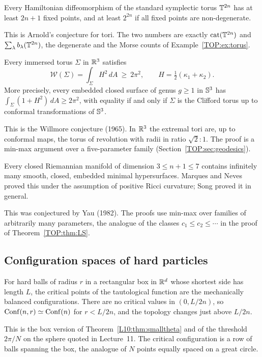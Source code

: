 \begin{theorem}
Every Hamiltonian diffeomorphism of the standard symplectic torus $\mathbb{T}^{2n}$ has at least $2n+1$ fixed points,
and at least $2^{2n}$ if all fixed points are non-degenerate.
\end{theorem}
\noindent This is Arnold's conjecture for tori. The two numbers are exactly
$\operatorname{cat}(\mathbb{T}^{2n})$ and $\sum_\lambda b_\lambda(\mathbb{T}^{2n})$, the degenerate and the Morse counts of
Example~\ref{TOP:ex:torus}.

\begin{theorem}\label{TOP:thm:willmore}
Every immersed torus $\Sigma$ in $\mathbb{R}^3$ satisfies
\[
  \mathcal W(\Sigma)=\int_\Sigma H^2\,dA\ \ge\ 2\pi^2,\qquad H=\tfrac12(\kappa_1+\kappa_2).
\]
More precisely, every embedded closed surface of genus $g\ge1$ in $\mathbb{S}^3$ has
$\int_\Sigma(1+H^2)\,dA\ge2\pi^2$, with equality if and only if $\Sigma$ is the Clifford torus up to
conformal transformations of $\mathbb{S}^3$.
\end{theorem}
\noindent This is the Willmore conjecture (1965). In $\mathbb{R}^3$ the extremal tori are, up to conformal
maps, the torus of revolution with radii in ratio $\sqrt2:1$. The proof is a min-max argument over a
five-parameter family (Section~\ref{TOP:sec:geodesics}).

\begin{theorem}\label{TOP:thm:yau}
Every closed Riemannian manifold of dimension $3\le n+1\le7$ contains infinitely many smooth, closed,
embedded minimal hypersurfaces. Marques and Neves proved this under the assumption of positive Ricci curvature;
Song proved it in general.
\end{theorem}
\noindent This was conjectured by Yau (1982). The proofs use min-max over families of arbitrarily many
parameters, the analogue of the classes $c_1\le c_2\le\cdots$ in the proof of Theorem~\ref{TOP:thm:LS}.

\subsection*{Configuration spaces of hard particles}

\begin{theorem}\label{TOP:thm:BBK}
For hard balls of radius $r$ in a rectangular box in $\mathbb{R}^d$ whose shortest side has length $L$, the
critical points of the tautological function are the mechanically balanced configurations. There are no
critical values in $(0,L/2n)$, so $\operatorname{Conf}(n,r)\simeq\operatorname{Conf}(n)$ for $r<L/2n$, and the topology changes just above
$L/2n$.
\end{theorem}
\noindent This is the box version of Theorem~\ref{L10:thm:smalltheta} and of the threshold $2\pi/N$ on the sphere
quoted in Lecture~11. The critical configuration is a row of balls spanning the box, the analogue of
$N$ points equally spaced on a great circle.

